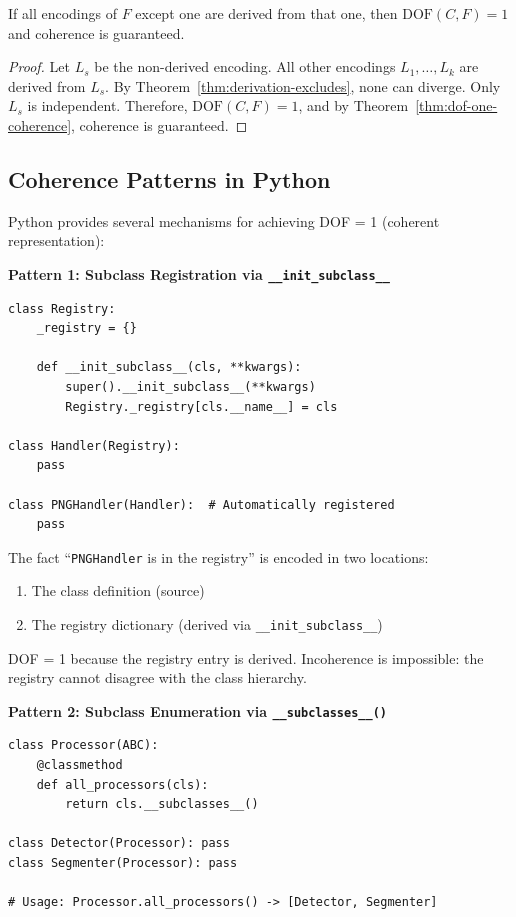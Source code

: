 \begin{corollary}\label{cor:metaprogramming}
If all encodings of $F$ except one are derived from that one, then $\text{DOF}(C, F) = 1$ and coherence is guaranteed.
\end{corollary}

\begin{proof}
Let $L_s$ be the non-derived encoding. All other encodings $L_1, \ldots, L_k$ are derived from $L_s$. By Theorem~\ref{thm:derivation-excludes}, none can diverge. Only $L_s$ is independent. Therefore, $\text{DOF}(C, F) = 1$, and by Theorem~\ref{thm:dof-one-coherence}, coherence is guaranteed.
\end{proof}

\subsection{Coherence Patterns in Python}\label{sec:ssot-patterns}

Python provides several mechanisms for achieving DOF = 1 (coherent representation):

\textbf{Pattern 1: Subclass Registration via \texttt{\_\_init\_subclass\_\_}}

\begin{verbatim}
class Registry:
    _registry = {}

    def __init_subclass__(cls, **kwargs):
        super().__init_subclass__(**kwargs)
        Registry._registry[cls.__name__] = cls

class Handler(Registry):
    pass

class PNGHandler(Handler):  # Automatically registered
    pass
\end{verbatim}

The fact ``\texttt{PNGHandler} is in the registry'' is encoded in two locations:
\begin{enumerate}
\tightlist
\item The class definition (source)
\item The registry dictionary (derived via \texttt{\_\_init\_subclass\_\_})
\end{enumerate}

DOF = 1 because the registry entry is derived. Incoherence is impossible: the registry cannot disagree with the class hierarchy.

\textbf{Pattern 2: Subclass Enumeration via \texttt{\_\_subclasses\_\_()}}

\begin{verbatim}
class Processor(ABC):
    @classmethod
    def all_processors(cls):
        return cls.__subclasses__()

class Detector(Processor): pass
class Segmenter(Processor): pass

# Usage: Processor.all_processors() -> [Detector, Segmenter]
\end{verbatim}

